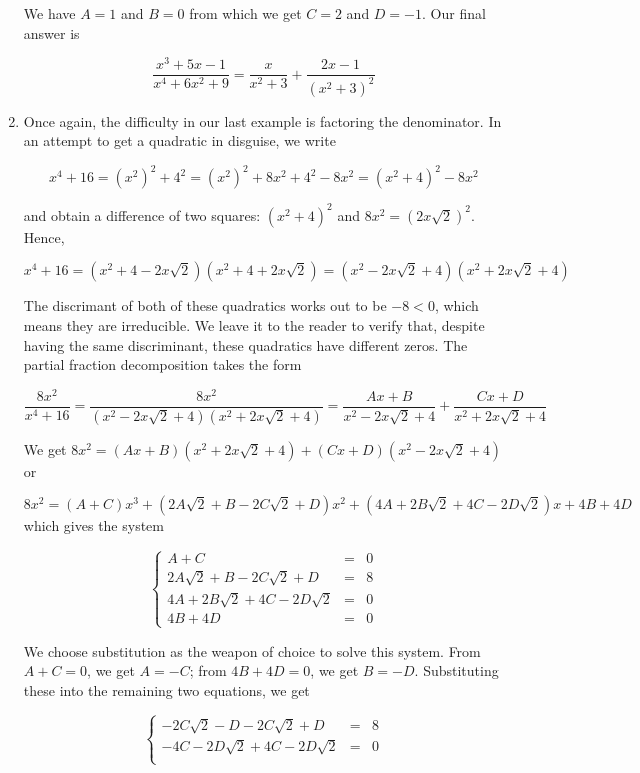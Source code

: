 \begin{ex}
\begin{enumerate}
We have $A = 1$ and $B = 0$ from which we get $C = 2$ and $D = -1$.  Our final answer is

\[ \dfrac{x^3+5x-1}{x^4+6x^2+9} = \dfrac{x}{x^2+3} + \dfrac{2x-1}{\left(x^2+3\right)^2}\]

\item  Once again, the difficulty in our last example is factoring the denominator.  In an attempt to get a quadratic in disguise, we write 

\[x^4 + 16 = \left(x^2\right)^2 + 4^2 = \left(x^2\right)^2 + 8x^2 + 4^2 - 8x^2 = \left(x^2+4\right)^2 - 8x^2\]

and obtain a difference of two squares:  $\left(x^2+4\right)^2$ and $8x^2 = \left(2x\sqrt{2}\right)^2$.  Hence,

\[x^4 + 16 = \left(x^2 + 4 - 2x\sqrt{2}\right)\left(x^2 + 4 + 2x\sqrt{2}\right) =\left(x^2 - 2x\sqrt{2} + 4\right)\left(x^2 + 2x\sqrt{2}+4 \right)  \]

The discrimant of both of these quadratics works out to be $-8 < 0$, which means they are irreducible.  We leave it to the reader to verify that, despite having the same discriminant, these quadratics have different zeros.  The partial fraction decomposition takes the form

\[ \dfrac{8x^2}{x^4+16} = \dfrac{8x^2}{\left(x^2 - 2x\sqrt{2} + 4\right)\left(x^2 + 2x\sqrt{2}+4 \right)} = \dfrac{Ax+B}{x^2 - 2x\sqrt{2} + 4} + \dfrac{Cx+D}{x^2 + 2x\sqrt{2} + 4}\]

We get $8x^2 = (Ax+B)\left(x^2 + 2x\sqrt{2}+4 \right) + (Cx+D)\left(x^2 - 2x\sqrt{2} + 4\right)$ or 

\[8x^2 = (A+C)x^3 + (2A\sqrt{2} + B - 2C\sqrt{2}+D)x^2 + (4A + 2B\sqrt{2}+4C - 2D\sqrt{2})x + 4B + 4D \] which gives the system

\[ \left\{ \begin{array}{rcr} A + C & = & 0 \\ 2A\sqrt{2} + B - 2C\sqrt{2}+D & = & 8 \\ 4A + 2B\sqrt{2}+4C - 2D\sqrt{2} & = & 0 \\ 4B + 4D  & = & 0 \end{array} \right.\]

We choose substitution as the weapon of choice to solve this system.   From $A+C = 0$, we get $A = -C$;  from $4B + 4D = 0$, we get $B = -D$.  Substituting these into the remaining two equations, we get

\[ \left\{ \begin{array}{rcr}  -2C\sqrt{2} -D - 2C\sqrt{2}+D & = & 8 \\ -4C - 2D\sqrt{2}+4C - 2D\sqrt{2} & = & 0 \\ \end{array} \right.\] 


\end{enumerate}
\end{ex}
